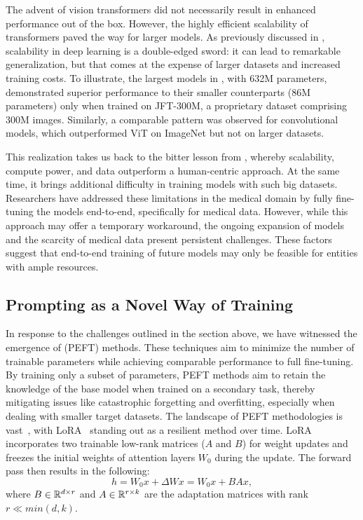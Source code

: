 The advent of vision transformers did not necessarily result in enhanced performance out of the box. However, the highly efficient scalability of transformers paved the way for larger models. As previously discussed in , scalability in deep learning is a double-edged sword: it can lead to remarkable generalization, but that comes at the expense of larger datasets and increased training costs. To illustrate, the largest models in , with 632M parameters, demonstrated superior performance to their smaller counterparts (86M parameters) only when trained on JFT-300M, a proprietary dataset comprising 300M images. Similarly, a comparable pattern was observed for convolutional models, which outperformed ViT on ImageNet but not on larger datasets.

This realization takes us back to the bitter lesson from , whereby scalability, compute power, and data outperform a human-centric approach. At the same time, it brings additional difficulty in training models with such big datasets. Researchers have addressed these limitations in the medical domain by fully fine-tuning the models end-to-end, specifically for medical data. However, while this approach may offer a temporary workaround, the ongoing expansion of models and the scarcity of medical data present persistent challenges. These factors suggest that end-to-end training of future models may only be feasible for entities with ample resources.

\subsection{Prompting as a Novel Way of Training}

In response to the challenges outlined in the section above, we have witnessed the emergence of  (PEFT) methods. These techniques aim to minimize the number of trainable parameters while achieving comparable performance to full fine-tuning. By training only a subset of parameters, PEFT methods aim to retain the knowledge of the base model when trained on a secondary task, thereby mitigating issues like catastrophic forgetting and overfitting, especially when dealing with smaller target datasets. The landscape of PEFT methodologies is vast~, with LoRA~ standing out as a resilient method over time. LoRA incorporates two trainable low-rank matrices ($A$ and $B$) for weight updates and freezes the initial weights of attention layers $W_0$ during the update. The forward pass then results in the following:
\begin{equation*}
    h = W_0x + \Delta Wx = W_0x + BAx,
\end{equation*}
where $B\in\mathbb{R}^{d\times r}$ and $A\in\mathbb{R}^{r\times k}$ are the adaptation matrices with rank $r \ll min(d,k)$. 

